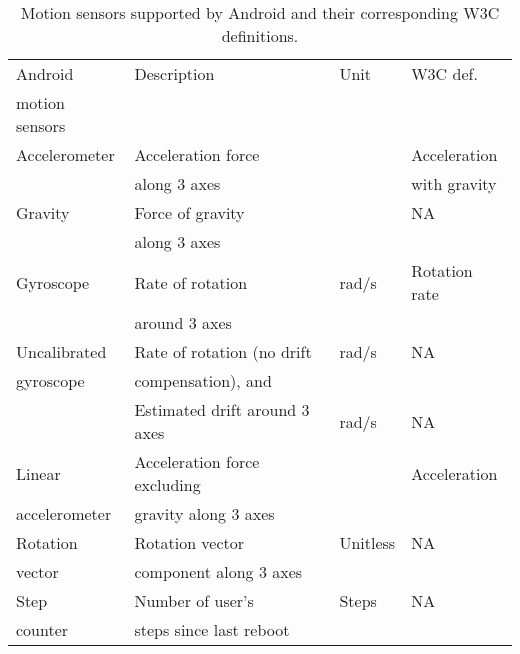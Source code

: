 \documentclass[10pt,twocolumn]{article}
\begin{document}
\begin{table*}[t]
\centering
\begin{tabular}{|l|l|l|l|}
\hline
Android & Description &  Unit & W3C def.\\
motion sensors & & &\\
\hline
Accelerometer & Acceleration force  & & Acceleration \\
& along 3 axes & & with gravity\\
\hline
Gravity & Force of gravity  &  & NA\\
& along 3 axes&&\\
\hline
Gyroscope & Rate of rotation  & rad/s & Rotation rate\\
&around 3 axes&&\\
\hline
Uncalibrated  & Rate of rotation (no drift & rad/s & NA\\
gyroscope&  compensation), and &&\\
& Estimated drift around 3 axes & rad/s & NA\\
\hline
Linear  & Acceleration force excluding &  & Acceleration\\
accelerometer & gravity along 3 axes&&\\
\hline
Rotation  & Rotation vector   & Unitless & NA\\
vector& component along 3 axes&&\\
\hline
Step  & Number of user's  & Steps& NA\\
counter & steps since last reboot&&\\
\hline
\end{tabular}
\caption{Motion sensors supported by Android and their corresponding W3C definitions.}
\label{androidmotion}
\end{table*}
\end{document}
